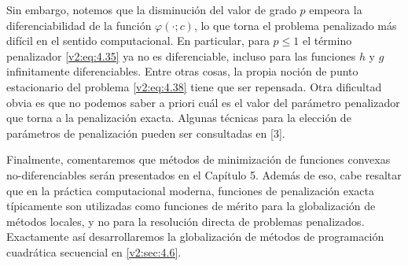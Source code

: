 Sin embargo, notemos que la disminución del valor de grado $p$ empeora la diferenciabilidad de la función $\varphi(\cdot; c)$, lo que torna el problema penalizado más difícil en el sentido computacional. En particular, para $p \le 1$ el término penalizador \eqref{v2:eq:4.35} ya no es diferenciable, incluso para las funciones $h$ y $g$ infinitamente diferenciables. Entre otras cosas, la propia noción de punto estacionario del problema \eqref{v2:eq:4.38} tiene que ser repensada. Otra dificultad obvia es que no podemos saber a priori cuál es el valor del parámetro penalizador que torna a la penalización exacta. Algunas técnicas para la elección de parámetros de penalización pueden ser consultadas en [3].

Finalmente, comentaremos que métodos de minimización de funciones convexas no-diferenciables serán presentados en el Capítulo 5. Además de eso, cabe resaltar que en la práctica computacional moderna, funciones de penalización exacta típicamente son utilizadas como funciones de mérito para la globalización de métodos locales, y no para la resolución directa de problemas penalizados. Exactamente así desarrollaremos la globalización de métodos de programación cuadrática secuencial en \cref{v2:sec:4.6}.